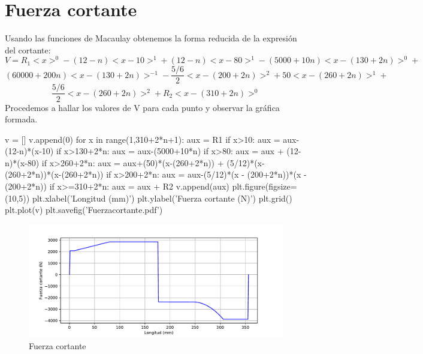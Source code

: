 \documentclass[a4paper,11pt]{report}
\begin{document}
\chapter*{Fuerza cortante}
Usando las funciones de Macaulay obtenemos la forma reducida de la expresión del cortante:
$$
V = R_{1} <x>^{0} - (12-n)<x-10>^{1} + (12-n)<x-80>^{1} - (5000+10n)<x-(130+2n)>^{0} + $$
$$(60000+200n)<x-(130+2n)>^{-1} - \frac{5/6}{2}<x-(200+2n)>^{2} + 50<x-(260+2n)>^{1} + $$
$$  \frac{5/6}{2}<x-(260+2n)>^{2} + R_{2} <x-(310+2n)>^{0}$$
Procedemos a hallar los valores de V para cada punto y observar la gráfica formada.
\begin{pyglist}[language=python,caption={Cálculo del cortante},style=tango]
v = []
v.append(0)
for x in range(1,310+2*n+1):
    aux = R1
    if x>10:
        aux = aux-(12-n)*(x-10)
    if x>130+2*n:
        aux = aux-(5000+10*n)
    if x>80:
        aux = aux + (12-n)*(x-80)
    if x>260+2*n:
        aux = aux+(50)*(x-(260+2*n)) + (5/12)*(x-(260+2*n))*(x-(260+2*n))
    if x>200+2*n:
        aux = aux-(5/12)*(x - (200+2*n))*(x - (200+2*n))
    if x>=310+2*n:
        aux = aux + R2
    v.append(aux)
plt.figure(figsize=(10,5))
plt.xlabel('Longitud (mm)')
plt.ylabel('Fuerza cortante (N)')
plt.grid()
plt.plot(v)
plt.savefig('Fuerzacortante.pdf')
\end{pyglist}
\begin{figure}[H]
\centering
\includegraphics[scale=0.72]{Fuerzacortante.pdf}
\caption{Fuerza cortante}
\end{figure}
\end{document}
